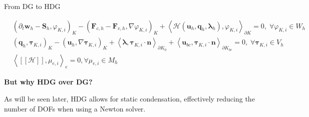 \documentclass[24pt,t,table, aspectratio=169]{beamer}
\newcommand{\vecu}{\mathbf{u}}
\newcommand{\vecF}{\mathbf{F}}
\newcommand{\vecS}{\mathbf{S}}
\newcommand{\vecq}{\mathbf{q}}
\newcommand{\vecw}{\mathbf{w}}
\newcommand{\vectau}{\boldsymbol{\tau}}
\newcommand{\vecHcal}{\boldsymbol{\mathcal{H}}}
\newcommand{\veclambda}{\boldsymbol{\lambda}}
\newcommand{\vecn}{\mathbf{n}}
\begin{document}
\begin{frame}{From DG to HDG}
{
\begin{framed}
\small
\begin{equation*}
\begin{aligned}
& \left(\partial_t \vecw_{h} - \vecS_{h}, \varphi_{K,i} \right)_{K} - \left(\vecF_{c, {h}} - \vecF_{v, {h}}, \nabla \varphi_{K,i} \right)_{K} + \left\langle \vecHcal(\vecu_h, \vecq_h, \veclambda_h), \varphi_{K,i} \right\rangle_{\partial K} = 0, \; \forall \varphi_{K,i} \in W_h\\
& \left(\vecq_h, \vectau_{K,i}\right)_{K} - \left(\vecu_h, \nabla \vectau_{K,i}\right)_{K} + \left\langle \veclambda, \vectau_{K,i} \cdot \vecn \right\rangle_{\partial K_0} + \left\langle \vecu_{bc}, \vectau_{K,i} \cdot \vecn \right\rangle_{\partial K_{bc}} = 0,\; \forall \vectau_{K,i} \in V_h\\
& \left\langle[[\vecHcal]], \mu_{e,i} \right\rangle_{e} = 0, \forall \mu_{e,i} \in M_h
\end{aligned}
\end{equation*}
\end{framed}

\begin{center}
\textbf{But why HDG over DG?}
\end{center}

}

{
As will be seen later, HDG allows for static condensation, effectively reducing the number of DOFs when using a Newton solver.
}

\end{frame}
\end{document}
